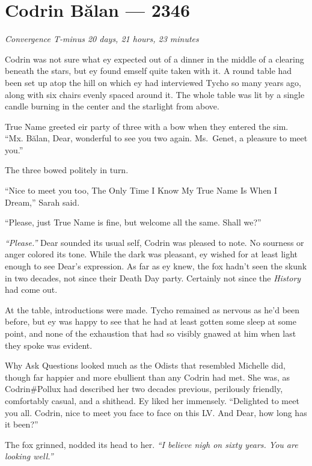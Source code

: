 \hypertarget{codrin-bux103lan-2346}{%
\chapter{Codrin Bălan — 2346}\label{codrin-bux103lan-2346}}

\begin{center}
\emph{Convergence T-minus 20 days, 21 hours, 23 minutes}
\end{center}

\noindent Codrin was not sure what ey expected out of a dinner in the middle of a clearing beneath the stars, but ey found emself quite taken with it. A round table had been set up atop the hill on which ey had interviewed Tycho so many years ago, along with six chairs evenly spaced around it. The whole table was lit by a single candle burning in the center and the starlight from above.

True Name greeted eir party of three with a bow when they entered the sim. ``Mx. Bălan, Dear, wonderful to see you two again. Ms.~Genet, a pleasure to meet you.''

The three bowed politely in turn.

``Nice to meet you too, The Only Time I Know My True Name Is When I Dream,'' Sarah said.

``Please, just True Name is fine, but welcome all the same. Shall we?''

\emph{``Please.''} Dear sounded its usual self, Codrin was pleased to note. No sourness or anger colored its tone. While the dark was pleasant, ey wished for at least light enough to see Dear's expression. As far as ey knew, the fox hadn't seen the skunk in two decades, not since their Death Day party. Certainly not since the \emph{History} had come out.

At the table, introductions were made. Tycho remained as nervous as he'd been before, but ey was happy to see that he had at least gotten some sleep at some point, and none of the exhaustion that had so visibly gnawed at him when last they spoke was evident.

Why Ask Questions looked much as the Odists that resembled Michelle did, though far happier and more ebullient than any Codrin had met. She was, as Codrin\#Pollux had described her two decades previous, perilously friendly, comfortably casual, and a shithead. Ey liked her immensely. ``Delighted to meet you all. Codrin, nice to meet you face to face on this LV. And Dear, how long has it been?''

The fox grinned, nodded its head to her. \emph{``I believe nigh on sixty years. You are looking well.''}

